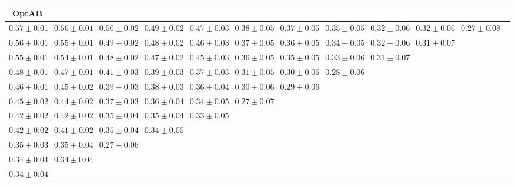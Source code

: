 \begin{table}[ht]
{{\begin{adjustbox}{width=\textwidth}
\begin{tabular}{cccccccccccc}
\hline
OptAB &  &  &  &  &  &  &  &  &  & \\
\hline
$0.57 \pm 0.01$ & $0.56 \pm 0.01$ & $0.50 \pm 0.02$ & $0.49 \pm 0.02$ & $0.47 \pm 0.03$ & $0.38 \pm 0.05$ & $0.37 \pm 0.05$ & $0.35 \pm 0.05$ & $0.32 \pm 0.06$ & $0.32 \pm 0.06$ & $0.27 \pm 0.08$ &  \\
$0.56 \pm 0.01$ & $0.55 \pm 0.01$ & $0.49 \pm 0.02$ & $0.48 \pm 0.02$ & $0.46 \pm 0.03$ & $0.37 \pm 0.05$ & $0.36 \pm 0.05$ & $0.34 \pm 0.05$ & $0.32 \pm 0.06$ & $0.31 \pm 0.07$ &  &  \\
$0.55 \pm 0.01$ & $0.54 \pm 0.01$ & $0.48 \pm 0.02$ & $0.47 \pm 0.02$ & $0.45 \pm 0.03$ & $0.36 \pm 0.05$ & $0.35 \pm 0.05$ & $0.33 \pm 0.06$ & $0.31 \pm 0.07$ &  &  &  \\
$0.48 \pm 0.01$ & $0.47 \pm 0.01$ & $0.41 \pm 0.03$ & $0.39 \pm 0.03$ & $0.37 \pm 0.03$ & $0.31 \pm 0.05$ & $0.30 \pm 0.06$ & $0.28 \pm 0.06$ &  &  &  &  \\
$0.46 \pm 0.01$ & $0.45 \pm 0.02$ & $0.39 \pm 0.03$ & $0.38 \pm 0.03$ & $0.36 \pm 0.04$ & $0.30 \pm 0.06$ & $0.29 \pm 0.06$ &  &  &  &  &  \\
$0.45 \pm 0.02$ & $0.44 \pm 0.02$ & $0.37 \pm 0.03$ & $0.36 \pm 0.04$ & $0.34 \pm 0.05$ & $0.27 \pm 0.07$ &  &  &  &  &  &  \\
$0.42 \pm 0.02$ & $0.42 \pm 0.02$ & $0.35 \pm 0.04$ & $0.35 \pm 0.04$ & $0.33 \pm 0.05$ &  &  &  &  &  &  &  \\
$0.42 \pm 0.02$ & $0.41 \pm 0.02$ & $0.35 \pm 0.04$ & $0.34 \pm 0.05$ &  &  &  &  &  &  &  &  \\
$0.35 \pm 0.03$ & $0.35 \pm 0.04$ & $0.27 \pm 0.06$ &  &  &  &  &  &  &  &  &  \\
$0.34 \pm 0.04$ & $0.34 \pm 0.04$ &  &  &  &  &  &  &  &  &  &  \\
$0.34 \pm 0.04$ &  &  &  &  &  &  &  &  &  &  &  \\



\end{tabular}
\end{adjustbox}}}
\end{table}
